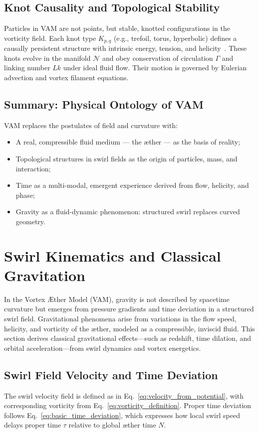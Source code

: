 \documentclass[preprint]{revtex4-2}
\begin{document}
    \subsection{Knot Causality and Topological Stability}
    Particles in VAM are not points, but stable, knotted configurations in the vorticity field. Each knot type $K_{p,q}$ (e.g., trefoil, torus, hyperbolic) defines a causally persistent structure with intrinsic energy, tension, and helicity~\cite{moffatt1969degree, arnold1998topological}. These knots evolve in the manifold $\mathcal{N}$ and obey conservation of circulation $\Gamma$ and linking number $Lk$ under ideal fluid flow. Their motion is governed by Eulerian advection and vortex filament equations.

    \subsection*{Summary: Physical Ontology of VAM}
    VAM replaces the postulates of field and curvature with:
    \begin{itemize}
        \item A real, compressible fluid medium — the æther — as the basis of reality;
        \item Topological structures in swirl fields as the origin of particles, mass, and interaction;
        \item Time as a multi-modal, emergent experience derived from flow, helicity, and phase;
        \item Gravity as a fluid-dynamic phenomenon: structured swirl replaces curved geometry.
    \end{itemize}

\section{Swirl Kinematics and Classical Gravitation}\label{sec:swirl-kinematics-and-classical-gravitation}
    In the Vortex \AE ther Model (VAM), gravity is not described by spacetime curvature but emerges from pressure gradients and time deviation in a structured swirl field. Gravitational phenomena arise from variations in the flow speed, helicity, and vorticity of the æther, modeled as a compressible, inviscid fluid. This section derives classical gravitational effects—such as redshift, time dilation, and orbital acceleration—from swirl dynamics and vortex energetics.

    \subsection{Swirl Field Velocity and Time Deviation}
    The swirl velocity field is defined as in Eq.~\ref{eq:velocity_from_potential}, with corresponding vorticity from Eq.~\ref{eq:vorticity_definition}. Proper time deviation follows Eq.~\ref{eq:basic_time_deviation}, which expresses how local swirl speed delays proper time $\tau$ relative to global æther time $N$.
\end{document}
